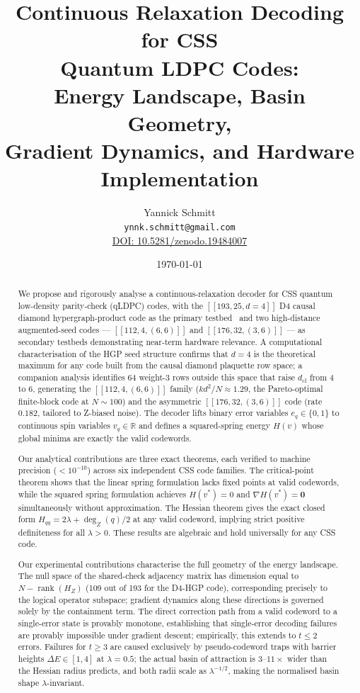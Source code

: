 \documentclass[12pt,a4paper]{article}
\title{\Large\bfseries Continuous Relaxation Decoding for CSS\\[4pt]
Quantum LDPC Codes:\\[4pt]
Energy Landscape, Basin Geometry,\\[4pt]
Gradient Dynamics, and Hardware Implementation}
\author{Yannick Schmitt \\
\texttt{ynnk.schmitt@gmail.com} \\
\vspace{4pt}
\href{https://doi.org/10.5281/zenodo.19484007}{DOI: 10.5281/zenodo.19484007}}
\date{\today}
\theoremstyle{plain}
\theoremstyle{definition}
\theoremstyle{remark}
\newcommand{\R}{\mathbb{R}}
\newcommand{\HZ}{H_Z}
\newcommand{\rank}{\operatorname{rank}}
\newcommand{\dZ}{\operatorname{deg}_Z}
\begin{document}
\maketitle

\begin{abstract}
We propose and rigorously analyse a continuous-relaxation decoder for CSS
quantum low-density parity-check (qLDPC) codes, with the
$[[193,25,d=4]]$ D4 causal diamond hypergraph-product code as the
primary testbed~\cite{Tillich2014,SchmittScale} and two high-distance
augmented-seed codes --- $[[112,4,(6,6)]]$ and $[[176,32,(3,6)]]$ ---
as secondary testbeds demonstrating near-term hardware relevance.
A computational characterisation of the HGP seed structure confirms
that $d=4$ is the theoretical maximum for any code built from the
causal diamond plaquette row space; a companion analysis identifies 64
weight-3 rows outside this space that raise $d_{\mathrm{cl}}$ from 4
to 6, generating the $[[112,4,(6,6)]]$ family ($kd^2/N \approx 1.29$,
the Pareto-optimal finite-block code at $N\sim100$) and the asymmetric
$[[176,32,(3,6)]]$ code (rate $0.182$, tailored to Z-biased noise).
The decoder lifts binary error variables $e_q \in \{0,1\}$ to
continuous spin variables $v_q \in \R$ and defines a squared-spring
energy $H(v)$ whose global minima are exactly the valid codewords.

Our analytical contributions are three exact theorems, each verified to
machine precision ($<10^{-10}$) across six independent CSS code families.
The critical-point theorem shows that the linear spring formulation lacks
fixed points at valid codewords, while the squared spring formulation
achieves $H(v^*)=0$ and $\nabla H(v^*)=\bm{0}$ simultaneously without
approximation.
The Hessian theorem gives the exact closed form $H_{qq}=2\lambda +
\dZ(q)/2$ at any valid codeword, implying strict positive definiteness
for all $\lambda>0$.
These results are algebraic and hold universally for any CSS code.

Our experimental contributions characterise the full geometry of the energy
landscape.
The null space of the shared-check adjacency matrix has dimension equal to
$N - \rank(\HZ)$ (109 out of 193 for the D4-HGP code), corresponding
precisely to the logical operator subspace; gradient dynamics along these
directions is governed solely by the containment term.
The direct correction path from a valid codeword to a single-error state
is provably monotone, establishing that single-error decoding failures are provably
impossible under gradient descent; empirically, this extends to $t\leq 2$ errors.
Failures for $t\geq 3$ are caused exclusively by pseudo-codeword traps
with barrier heights $\Delta E \in [1, 4]$ at $\lambda=0.5$; the actual
basin of attraction is $3$--$11\times$ wider than the Hessian radius
predicts, and both radii scale as $\lambda^{-1/2}$, making the normalised
basin shape $\lambda$-invariant.


\end{abstract}
\end{document}

